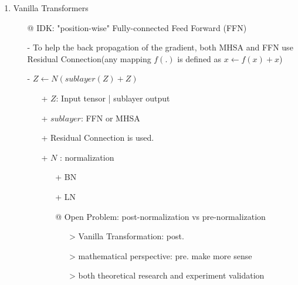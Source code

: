 \documentclass{report}
\begin{document}
\begin{enumerate}
\begin{itemize}
			
		\end{itemize}
		\item Vanilla Transformers
		\begin{itemize}
			\item[@] IDK: "position-wise" Fully-connected Feed Forward (FFN) 
			\item[-] To help the back propagation of the gradient, both MHSA and FFN use Residual Connection(any mapping $f(.)$ is defined as $x \longleftarrow f(x) + x$)
			
			\item[-] $ Z \longleftarrow N(sublayer(Z) + Z) $
			\begin{itemize}
				\item[+] $Z$: Input tensor | sublayer output
				\item[+] $sublayer$: FFN or MHSA
				\item[+] Residual Connection is used.
				\item[+] $N$ : normalization
				\begin{itemize}
					\item[+] BN
					\item[+] LN
					\item[@] Open Problem: post-normalization vs  pre-normalization 
					\begin{itemize}
						\item[>] Vanilla Transformation: post.
						\item[>] mathematical perspective: pre. make more sense
						\item[>] both theoretical research and experiment validation
					\end{itemize}
				\end{itemize}
				
			\end{itemize}
			
		\end{itemize}
	\end{enumerate}
	
	
	
	
\end{document}
